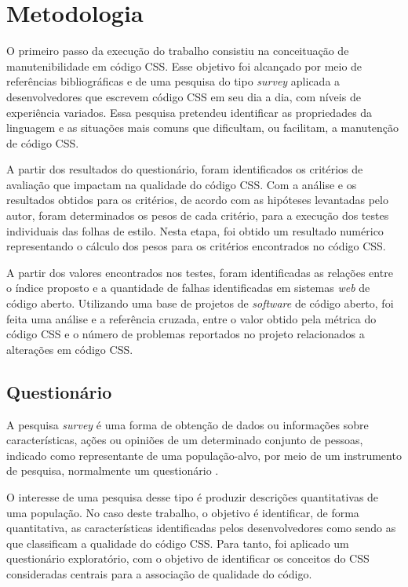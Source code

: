 %
%

\chapter{Metodologia}

O primeiro passo da execução do trabalho consistiu na conceituação de manutenibilidade em código CSS. Esse objetivo foi alcançado por meio de referências bibliográficas e de uma pesquisa do tipo \textit{survey} aplicada a desenvolvedores que escrevem código CSS em seu dia a dia, com níveis de experiência variados. Essa pesquisa pretendeu identificar as propriedades da linguagem e as situações mais comuns que dificultam, ou facilitam, a manutenção de código CSS.

A partir dos resultados do questionário, foram identificados os critérios de avaliação que impactam na qualidade do código CSS. Com a análise e os resultados obtidos para os critérios, de acordo com as hipóteses levantadas pelo autor, foram determinados os pesos de cada critério, para a execução dos testes individuais das folhas de estilo. Nesta etapa, foi obtido um resultado numérico representando o cálculo dos pesos para os critérios encontrados no código CSS.

A partir dos valores encontrados nos testes, foram identificadas as relações entre o índice proposto e a quantidade de falhas identificadas em sistemas \textit{web} de código aberto. Utilizando uma base de projetos de \textit{software} de código aberto, foi feita uma análise e a referência cruzada, entre o valor obtido pela métrica do código CSS e o número de problemas reportados no projeto relacionados a alterações em código CSS.

\section{Questionário}

A pesquisa \textit{survey} é uma forma de obtenção de dados ou informações sobre características, ações ou opiniões de um determinado conjunto de pessoas, indicado como representante de uma população-alvo, por meio de um instrumento de pesquisa, normalmente um questionário \cite{Freitas2000}. 

O interesse de uma pesquisa desse tipo é produzir descrições quantitativas de uma população. No caso deste trabalho, o objetivo é identificar, de forma quantitativa, as características identificadas pelos desenvolvedores como sendo as que classificam a qualidade do código CSS. Para tanto, foi aplicado um questionário exploratório, com o objetivo de identificar os conceitos do CSS consideradas centrais para a associação de qualidade do código.

